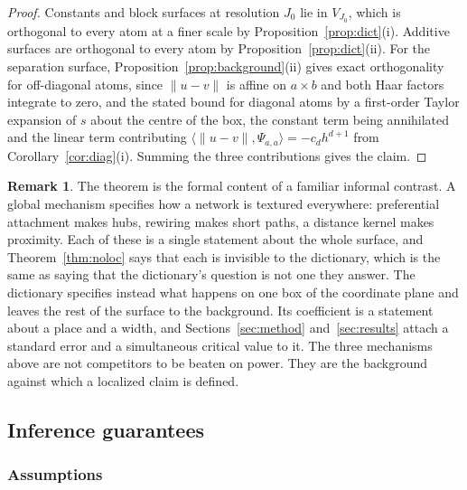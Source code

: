 \documentclass[11pt]{article}
\theoremstyle{definition}
\newtheorem{remark}[definition]{Remark}
\newcommand{\1}{\mathbf 1}\newcommand{\op}{\operatorname}
\begin{document}
\begin{proof}
Constants and block surfaces at resolution $J_0$ lie in $V_{J_0}$, which is
orthogonal to every atom at a finer scale by
Proposition~\ref{prop:dict}\textup{(i)}.  Additive surfaces are orthogonal to
every atom by Proposition~\ref{prop:dict}\textup{(ii)}.  For the separation
surface, Proposition~\ref{prop:background}\textup{(ii)} gives exact
orthogonality for off-diagonal atoms, since $\|u-v\|$ is affine on
$a\times b$ and both Haar factors integrate to zero, and the stated bound for
diagonal atoms by a first-order Taylor expansion of $s$ about the centre of
the box, the constant term being annihilated and the linear term contributing
$\langle\|u-v\|,\Psi_{a,a}\rangle=-c_dh^{d+1}$ from
Corollary~\ref{cor:diag}\textup{(i)}.  Summing the three contributions gives
the claim.
\end{proof}

\begin{remark}
The theorem is the formal content of a familiar informal contrast.  A global
mechanism specifies how a network is textured everywhere: preferential
attachment makes hubs, rewiring makes short paths, a distance kernel makes
proximity.  Each of these is a single statement about the whole surface, and
Theorem~\ref{thm:noloc} says that each is invisible to the dictionary, which
is the same as saying that the dictionary's question is not one they answer.
The dictionary specifies instead what happens on one box of the coordinate
plane and leaves the rest of the surface to the background.  Its coefficient is
a statement about a place and a width, and
Sections~\ref{sec:method} and~\ref{sec:results} attach a standard error and a
simultaneous critical value to it.  The three mechanisms above are not
competitors to be beaten on power.  They are the background against which a
localized claim is defined.
\end{remark}


\subsection{Inference guarantees}                         \label{app:sec-thy-inf}


\subsubsection{Assumptions}
\end{document}
